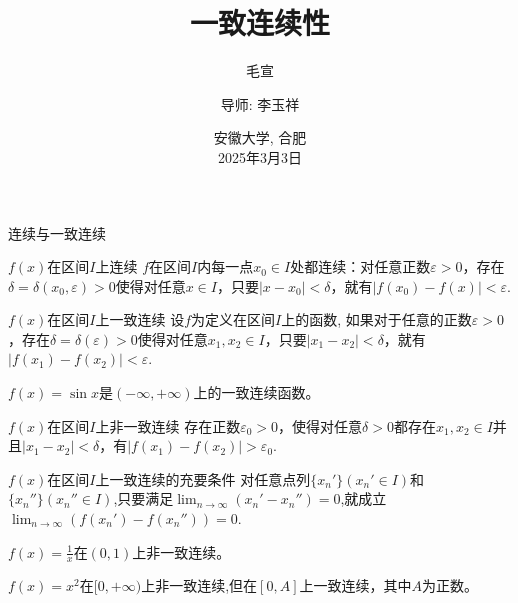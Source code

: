 \documentclass[10pt]{beamer}
\title{一致连续性}
\author{毛宣\inst{1}\and
    导师: 李玉祥\inst{1}}
\institute{
    \inst{1}东南大学数学学院
    }
\date{
    安徽大学, 合肥\\
    2025年3月3日
    }
\theoremstyle{remark}
\begin{document}
\begin{frame}
\end{frame}




\begin{frame}{连续与一致连续}
  \begin{block}{$f(x)$在区间$I$上连续}
    $f$在区间$I$内每一点$x_0\in I$处都连续：对任意正数$\varepsilon>0$，存在$\delta=\delta(x_0,\varepsilon)>0$使得对任意$x\in I$，只要$|x-x_0|<\delta$，就有$|f(x_0)-f(x)|<\varepsilon$.
  \end{block}
  \begin{block}{$f(x)$在区间$I$上一致连续}
    设$f$为定义在区间$I$上的函数, 如果对于任意的正数$\varepsilon>0$，存在$\delta=\delta(\varepsilon)>0$使得对任意$x_1,x_2\in I$，只要$|x_1-x_2|<\delta$，就有$|f(x_1)-f(x_2)|<\varepsilon$.
  \end{block}
  \begin{example}
    $f(x) = \sin x$是$(-\infty,+\infty)$上的一致连续函数。
  \end{example}
\end{frame}

\begin{frame}
  \begin{block}{$f(x)$在区间$I$上非一致连续}
  存在正数$\varepsilon_0>0$，使得对任意$\delta>0$都存在$x_1,x_2\in I$并且$|x_1-x_2|<\delta$，有$|f(x_1)-f(x_2)|>\varepsilon_0$.
  \end{block}
  \begin{block}{$f(x)$在区间$I$上一致连续的充要条件}
    对任意点列$\{x_n'\}(x_n'\in I)$和 $\{x_n''\}(x_n''\in I)$,只要满足$\lim_{n\to\infty}(x_n'-x_n'') = 0$,就成立$\lim_{n\to\infty}(f(x_n')-f(x_n''))=0$.
  \end{block}
  \begin{example}
    $f(x) =  \frac1x$在$(0,1)$上非一致连续。
  \end{example}
  \begin{example}
    $f(x) =  x^2$在$[0,+\infty)$上非一致连续,但在$[0,A]$上一致连续，其中$A$为正数。
  \end{example}
\end{frame}
\end{document}
